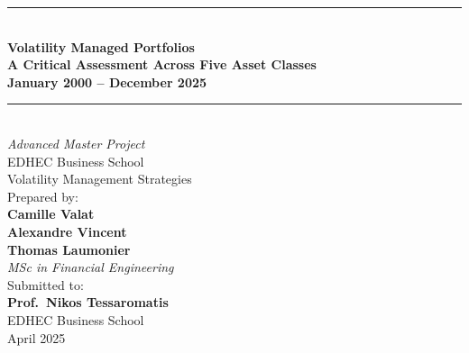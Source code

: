 \documentclass[12pt, a4paper]{article}
\begin{document}
\begin{titlepage}
\centering
\vspace*{2cm}
{\color{edhec}\rule{\linewidth}{1.5pt}}\\[0.4cm]
{\LARGE\bfseries\color{edhec} Volatility Managed Portfolios\\[0.3cm]
\large A Critical Assessment Across Five Asset Classes\\[0.2cm]
\normalsize January 2000 -- December 2025}\\[0.4cm]
{\color{edhec}\rule{\linewidth}{1.5pt}}\\[1.5cm]
{\large\textit{Advanced Master Project}}\\[0.3cm]
{\large EDHEC Business School}\\[0.3cm]
{\large Volatility Management Strategies}\\[1.2cm]

{\normalsize Prepared by:}\\[0.3cm]
{\large \textbf{Camille Valat}}\\[0.1cm]
{\large \textbf{Alexandre Vincent}}\\[0.1cm]
{\large \textbf{Thomas Laumonier}}\\[0.4cm]
{\normalsize \textit{MSc in Financial Engineering}}\\[1.2cm]

{\normalsize Submitted to:}\\[0.2cm]
{\large\bfseries Prof.\ Nikos Tessaromatis}\\[0.2cm]
{\normalsize EDHEC Business School}\\[2cm]
{\normalsize April 2025}
\vfill
\end{titlepage}
\end{document}
